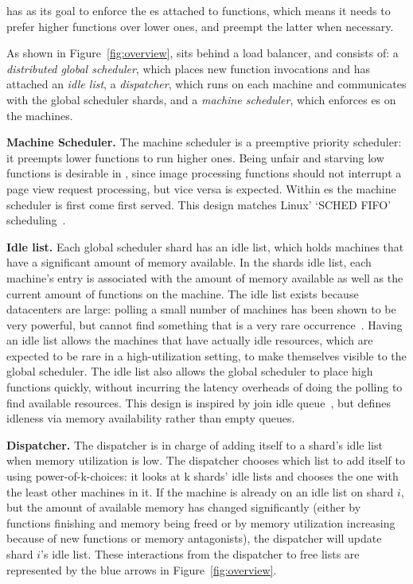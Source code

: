 \Sys{} has as its goal to enforce the \class{}es attached to functions, which
means it needs to prefer higher \class{} functions over lower ones, and preempt
the latter when necessary.
  

As shown in Figure~\ref{fig:overview}, \sys{} sits behind a load balancer, and
consists of: a \textit{distributed global scheduler}, which places new function
invocations and has attached an \textit{idle list}, a \textit{dispatcher},
which runs on each machine and communicates with the global scheduler shards,
and a \textit{machine scheduler}, which enforces \class{}es on the machines.


\textbf{Machine Scheduler.}
The machine scheduler is a preemptive priority scheduler: it preempts lower
\class{} functions to run higher \class{} ones. Being unfair and starving low
\class{} functions is desirable in \sys{}, since image processing functions
should not interrupt a page view request processing, but vice versa is expected.
Within \class{}es the machine scheduler is first come first served. This design
matches Linux' `SCHED FIFO' scheduling~\cite{linux-sched}.


\textbf{Idle list.}
Each global scheduler shard has an idle list, which holds machines that have a
significant amount of memory available. In the shards idle list, each machine's
entry is associated with the amount of memory available as well as the current
amount of functions on the machine. The idle list exists because datacenters are
large: polling a small number of machines has been shown to be very powerful,
but cannot find something that is a very rare occurrence~\cite{join-idle-queue}.
Having an idle list allows the machines that have actually idle resources, which
are expected to be rare in a high-utilization setting, to make themselves
visible to the global scheduler. The idle list also allows the global scheduler
to place high \class{} functions quickly, without incurring the latency
overheads of doing the polling to find available resources. This design is
inspired by join idle queue~\cite{join-idle-queue}, but defines idleness via
memory availability rather than empty queues.


\textbf{Dispatcher.}
The dispatcher is in charge of adding itself to a shard's idle list when memory
utilization is low. The dispatcher chooses which list to add itself to using
power-of-k-choices: it looks at k shards' idle lists and chooses the one with
the least other machines in it. If the machine is already on an idle list on
shard $i$, but the amount of available memory has changed significantly (either
by functions finishing and memory being freed or by memory utilization
increasing because of new functions or memory antagonists), the dispatcher will
update shard $i$'s idle list. These interactions from the dispatcher to free
lists are represented by the blue arrows in Figure~\ref{fig:overview}.

